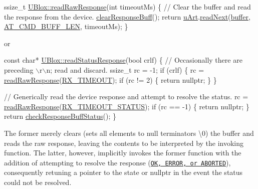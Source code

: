 \begin{DoxyCode}
ssize\_t \hyperlink{class_u_blox_ab4a7ab4b8922d91e23f273ae160c1bed}{UBlox::readRawResponse}(\textcolor{keywordtype}{int} timeoutMs)
\{
    \textcolor{comment}{// Clear the buffer and read the response from the device.}
    \hyperlink{class_u_blox_afc846fbcb1cbd49057b5ce39cd0e0dd6}{clearResponseBuff}();
    \textcolor{keywordflow}{return} \hyperlink{class_u_blox_a034c0463d1c199d094d657c8ebb151e8}{uArt}.\hyperlink{class_u_art_aa4818ca67447e251680b4b8d28c8bba5}{readNext}(\hyperlink{class_u_blox_a6ca4b90f3dc4e856181dce1ebda6f82c}{buffer}, \hyperlink{_u_blox_8h_aad458adf8f40cbcc1074061f226a112e}{AT\_CMD\_BUFF\_LEN}, timeoutMs);
\}
\end{DoxyCode}


or


\begin{DoxyCode}
\textcolor{keyword}{const} \textcolor{keywordtype}{char}* \hyperlink{class_u_blox_a4eaca5b1b1c4b5b6f6164b220dd43e0b}{UBlox::readStatusResponse}(\textcolor{keywordtype}{bool} crlf)
\{
    \textcolor{comment}{// Occasionally there are preceding \(\backslash\)r\(\backslash\)n; read and discard.}
    ssize\_t rc = -1;
    \textcolor{keywordflow}{if} (crlf) \{
        rc = \hyperlink{class_u_blox_ab4a7ab4b8922d91e23f273ae160c1bed}{readRawResponse}(\hyperlink{_u_blox_8cpp_ab6426fc74901f4fbec94862ebb672b81}{RX\_TIMEOUT});
        \textcolor{keywordflow}{if} (rc != 2) \{
            \textcolor{keywordflow}{return} \textcolor{keyword}{nullptr};
        \}
    \}

    \textcolor{comment}{// Generically read the device response and attempt to resolve the status.}
    rc = \hyperlink{class_u_blox_ab4a7ab4b8922d91e23f273ae160c1bed}{readRawResponse}(\hyperlink{_u_blox_8cpp_afed44347eb1fde151258e73004078c98}{RX\_TIMEOUT\_STATUS});
    \textcolor{keywordflow}{if} (rc == -1) \{
        \textcolor{keywordflow}{return} \textcolor{keyword}{nullptr};
    \}
    \textcolor{keywordflow}{return} \hyperlink{class_u_blox_aab6ad68e4c7522278f19ceab1dc2a58d}{checkResponseBuffStatus}();
\}
\end{DoxyCode}


The former merely clears (sets all elements to null terminators \textquotesingle{}\textbackslash{}0\textquotesingle{}) the buffer and reads the raw response, leaving the contents to be interpreted by the invoking function. The latter, however, implicitly invokes the former function with the addition of attempting to resolve the response (\href{https://github.com/itsBelinda/ENG5220-2020-Team13/wiki/uBlox-and-CellLocate}{\tt OK, E\+R\+R\+OR, or A\+B\+O\+R\+T\+ED}), consequently retuning a pointer to the state or nullptr in the event the status could not be resolved.

